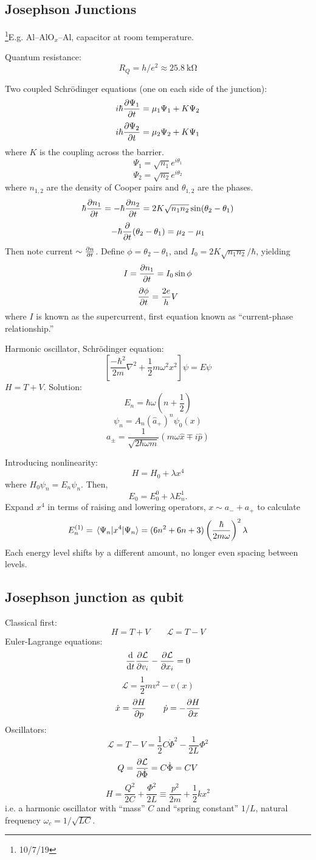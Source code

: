 \documentclass[12pt]{article}
\begin{document}
\subsection{Josephson Junctions}
\footnote{10/7/19}E.g. Al--AlO$_x$--Al, capacitor at room temperature.

Quantum resistance:
\[R_Q = h / e^2 \approx \SI{25.8}{\kilo\ohm}\]

Two coupled Schr\"odinger equations (one on each side of the junction):
\[i \hbar \pdv{\Psi_1}{t} = \mu_1 \Psi_1 + K\Psi_2\]
\[i \hbar \pdv{\Psi_2}{t} = \mu_2 \Psi_2 + K\Psi_1\]
where $K$ is the coupling across the barrier.
\[\Psi_1 = \sqrt{n_1} e^{i \theta_1}\]
\[\Psi_2 = \sqrt{n_2} e^{i \theta_2}\]
where $n_{1,2}$ are the density of Cooper pairs and $\theta_{1,2}$ are the
phases.
\[\hbar\pdv{n_1}{t} = -\hbar\pdv{n_2}{t} = 2K\sqrt{n_1n_2}\sin(\theta_2 -
\theta_1)\]
\[-\hbar\pdv{t} (\theta_2 - \theta_1) = \mu_2 - \mu_1\]
Then note current $\sim \pdv{n}{t}$. Define $\phi = \theta_2 - \theta_1$, and
$I_0 = 2K\sqrt{n_1n_2}/\hbar$, yielding
\[I = \pdv{n_1}{t} = I_0 \sin\phi\]
\[\pdv{\phi}{t} = \frac{2e}{h} V\]
where $I$ is known as the supercurrent, first equation known as ``current-phase
relationship.''

Harmonic oscillator, Schr\"odinger equation:
\[\left[\frac{-\hbar^2}{2m}\nabla^2 + \frac{1}{2} m\omega^2x^2\right]\psi
= E\psi\]
$H = T + V$.
Solution:
\[E_n = \hbar\omega\left(n + \frac{1}{2} \right)\]
\[\psi_n = A_n \left(\hat{a}_+\right)^n \psi_0(x)\]
\[a_\pm = \frac{1}{\sqrt{2\hbar\omega m}} (m\omega\hat{x} \mp i\hat{p})\]

Introducing nonlinearity:
\[H = H_0 + \lambda x^4\]
where $H_0\psi_n = E_n\psi_n$. Then,
\[E_0 = E_0^0 + \lambda E_n^1.\]
Expand $x^4$ in terms of raising and lowering operators, $x \sim a_- + a_+$ to
calculate
\[E_n^{(1)} = \ev{x^4}{\Psi_n} = (6n^2 + 6n +
3)\left(\frac{\hbar}{2m\omega}\right)^2\lambda\]
Each energy level shifts by a different amount, no longer even spacing between
levels.

\subsection{Josephson junction as qubit}
\newcommand*{\LL}{\mathcal{L}}
Classical first:
\[H = T + V \qquad \LL = T - V\]
Euler-Lagrange equations:
\[\dv{t} \pdv{\LL}{v_i} - \pdv{\LL}{x_i} = 0\]
\[\LL = \frac{1}{2} mv^2 - v(x)\]
\[\dot{x} = \pdv{H}{p} \qquad \dot{p} = -\pdv{H}{x}\]
Oscillators:
\[\LL = T - V = \frac{1}{2}C\dot{\Phi}^2 - \frac{1}{2L} \Phi^2\]
\[Q = \pdv{\LL}{\dot{\Phi}} = C\dot{\Phi} = CV\]
\[H = \frac{Q^2}{2C} + \frac{\Phi^2}{2L} \equiv \frac{p^2}{2m} + \frac{1}{2}
kx^2\]
i.e. a harmonic oscillator with ``mass'' $C$ and ``spring constant'' $1/L$,
natural frequency $\omega_c = 1 / \sqrt{LC}$.
\end{document}
